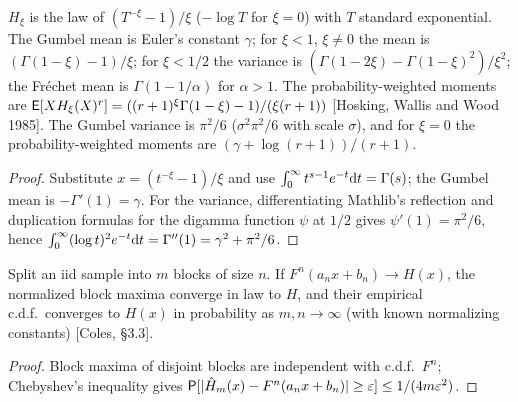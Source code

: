 \begin{theorem}
  \label{thm:gev-moments}
  \leanok
  $H_\xi$ is the law of $(T^{-\xi} - 1)/\xi$ ($-\log T$ for $\xi = 0$) with $T$ standard
  exponential. The Gumbel mean is Euler's constant $\gamma$; for $\xi < 1$, $\xi \ne 0$ the mean is
  $(\Gamma(1 - \xi) - 1)/\xi$; for $\xi < 1/2$ the variance is
  $(\Gamma(1 - 2\xi) - \Gamma(1 - \xi)^2)/\xi^2$; the Fr\'echet mean is $\Gamma(1 - 1/\alpha)$ for
  $\alpha > 1$. The probability-weighted moments are
  $\mathsf{E}[X H_\xi(X)^r] = ((r+1)^\xi \Gamma(1 - \xi) - 1)/(\xi(r+1))$
  [Hosking, Wallis and Wood 1985]. The Gumbel variance is $\pi^2/6$ ($\sigma^2\pi^2/6$ with scale
  $\sigma$), and for $\xi = 0$ the probability-weighted moments are $(\gamma + \log(r+1))/(r+1)$.
\end{theorem}
\begin{proof}
  \leanok
  Substitute $x = (t^{-\xi} - 1)/\xi$ and use $\int_0^\infty t^{s-1} e^{-t} \mathrm{d} t = \Gamma(s)$; the
  Gumbel mean is $-\Gamma'(1) = \gamma$. For the variance, differentiating Mathlib's reflection and duplication
  formulas for the digamma function $\psi$ at $1/2$ gives $\psi'(1) = \pi^2/6$, hence
  $\int_0^\infty (\log t)^2 e^{-t} \mathrm{d} t = \Gamma''(1) = \gamma^2 + \pi^2/6$.
\end{proof}

\begin{theorem}
  \label{thm:block-maxima}
  \leanok
  Split an iid sample into $m$ blocks of size $n$. If $F^n(a_n x + b_n) \to H(x)$, the normalized
  block maxima converge in law to $H$, and their empirical c.d.f.\ converges to $H(x)$ in probability
  as $m, n \to \infty$ (with known normalizing constants) [Coles, \S3.3].
\end{theorem}
\begin{proof}
  \leanok
  Block maxima of disjoint blocks are independent with c.d.f.\ $F^n$; Chebyshev's inequality gives
  $\mathsf{P}[|\hat H_m(x) - F^n(a_n x + b_n)| \ge \varepsilon] \le 1/(4 m \varepsilon^2)$.
\end{proof}
